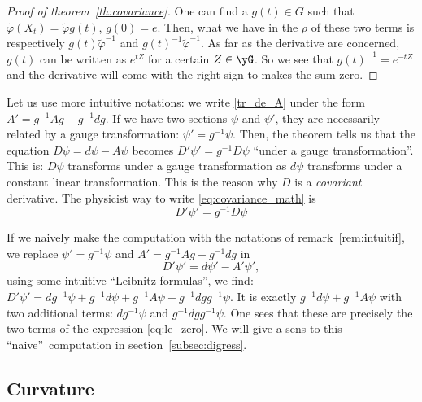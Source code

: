 \begin{proof}[Proof of theorem~\ref{th:covariance}]
One can find a $g(t)\in G$ such that $\tilde{\varphi}(X_t)=\tilde{\varphi} g(t)$, $g(0)=e$. Then, what we have in the $\rho$ of these two terms is respectively $g(t)\tilde{\varphi}^{-1}$ and $g(t)^{-1}\tilde{\varphi}^{-1}$. As far as the derivative are concerned, $g(t)$ can be written as $e^{tZ}$ for a certain $Z\in\yG$. So we see that $g(t)^{-1}=e^{-tZ}$ and the derivative will come with the right sign to makes the sum zero.
\end{proof}

\begin{remark}
Let us use more intuitive notations: we write \eqref{tr_de_A} under the form $A'=g^{-1} Ag-g^{-1} dg$. If we have two sections  $\psi$ and $\psi'$, they are necessarily related by a gauge transformation: $\psi'=g^{-1}\psi$. Then, the theorem tells us that the equation $D\psi=d\psi-A\psi$ becomes $D'\psi'=g^{-1} D\psi$ ``under a gauge transformation''. This is: $D\psi$ transforms under a gauge transformation as $d\psi$ transforms under a constant linear transformation. This is the reason why $D$ is a \emph{covariant} derivative. The physicist way to write \eqref{eq:covariance_math} is
\begin{equation}\label{eq:covariance_phys}
    D'\psi'=g^{-1} D\psi
\end{equation}
\label{rem:intuitif}
\end{remark}

\begin{remark}
If we naively make the computation with the notations of remark~\ref{rem:intuitif}, we replace $\psi'=g^{-1}\psi$ and $A'=g^{-1} Ag-g^{-1} dg$ in
\[
  D'\psi'=d\psi'-A'\psi',
\]
using some intuitive ``Leibnitz formulas'', we find:
$D'\psi'=dg^{-1}\psi+g^{-1} d\psi+g^{-1} A\psi+g^{-1} dg g^{-1}\psi$. It is exactly $g^{-1} d\psi+g^{-1} A\psi$ with two additional terms: $dg^{-1}\psi$ and $g^{-1} dg g^{-1}\psi$. One sees that these are precisely the two terms of the expression \eqref{eq:le_zero}. We will give a sens to this ``naive''\ computation in section~\ref{subsec:digress}.
\end{remark}

\subsection{Curvature}

